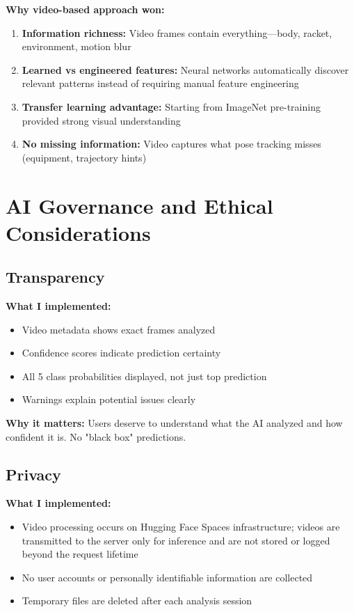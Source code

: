 \documentclass[11pt,a4paper]{article}
\begin{document}
\textbf{Why video-based approach won:}
\begin{enumerate}
\item \textbf{Information richness:} Video frames contain everything---body, racket, environment, motion blur
\item \textbf{Learned vs engineered features:} Neural networks automatically discover relevant patterns instead of requiring manual feature engineering
\item \textbf{Transfer learning advantage:} Starting from ImageNet pre-training provided strong visual understanding
\item \textbf{No missing information:} Video captures what pose tracking misses (equipment, trajectory hints)
\end{enumerate}

\section{AI Governance and Ethical Considerations}

\subsection{Transparency}

\textbf{What I implemented:}
\begin{itemize}
\item Video metadata shows exact frames analyzed
\item Confidence scores indicate prediction certainty
\item All 5 class probabilities displayed, not just top prediction
\item Warnings explain potential issues clearly
\end{itemize}

\textbf{Why it matters:} Users deserve to understand what the AI analyzed and how confident it is. No "black box" predictions.

\subsection{Privacy}

\textbf{What I implemented:}
\begin{itemize}
\item Video processing occurs on Hugging Face Spaces infrastructure; videos are transmitted to the server only for inference and are not stored or logged beyond the request lifetime
\item No user accounts or personally identifiable information are collected
\item Temporary files are deleted after each analysis session
\end{itemize}
\end{document}
